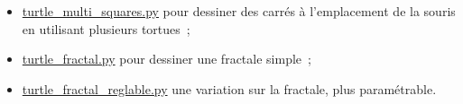 \begin{itemize}
\tightlist
\item
  \href{media/turtle_multi_squares.py}{turtle\_multi\_squares.py} pour
  dessiner des carrés à l'emplacement de la souris en utilisant
  plusieurs tortues~;
\item
  \href{media/turtle_fractal.py}{turtle\_fractal.py} pour dessiner une
  fractale simple~;
\item
  \href{media/turtle_fractal_reglable.py}{turtle\_fractal\_reglable.py}
  une variation sur la fractale, plus paramétrable.
\end{itemize}


    
    
    
